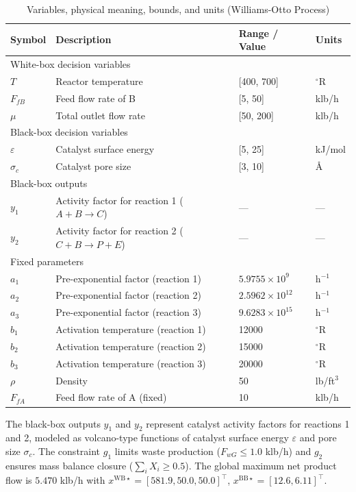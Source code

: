 \documentclass[12pt,a4paper]{article}%
\theoremstyle{plain}%
\theoremstyle{remark}%
\theoremstyle{definition}%
\def\WB{\mathrm{WB}}
\def\BB{\mathrm{BB}}
\begin{document}
\begin{appendices}
\begin{table}[htbp]
\centering
\caption{Variables, physical meaning, bounds, and units (Williams-Otto Process)}
\label{tab:williams_otto_vars}
\begin{tabular}{@{}llll@{}}
\toprule
\textbf{Symbol} & \textbf{Description} & \textbf{Range / Value} & \textbf{Units} \\
\midrule
\multicolumn{4}{l}{White-box decision variables} \\
\midrule
$T$ & Reactor temperature & [400, 700] & $^\circ$R \\
$F_{fB}$ & Feed flow rate of B & [5, 50] & klb/h \\
$\mu$ & Total outlet flow rate & [50, 200] & klb/h \\
\midrule
\multicolumn{4}{l}{Black-box decision variables} \\
\midrule
$\varepsilon$ & Catalyst surface energy & [5, 25] & kJ/mol \\
$\sigma_c$ & Catalyst pore size & [3, 10] & \AA \\
\midrule
\multicolumn{4}{l}{Black-box outputs} \\
\midrule
$y_1$ & Activity factor for reaction 1 ($A + B \to C$) & --- & --- \\
$y_2$ & Activity factor for reaction 2 ($C + B \to P + E$) & --- & --- \\
\midrule
\multicolumn{4}{l}{Fixed parameters} \\
\midrule
$a_1$ & Pre-exponential factor (reaction 1) & $5.9755 \times 10^9$ & h$^{-1}$ \\
$a_2$ & Pre-exponential factor (reaction 2) & $2.5962 \times 10^{12}$ & h$^{-1}$ \\
$a_3$ & Pre-exponential factor (reaction 3) & $9.6283 \times 10^{15}$ & h$^{-1}$ \\
$b_1$ & Activation temperature (reaction 1) & 12000 & $^\circ$R \\
$b_2$ & Activation temperature (reaction 2) & 15000 & $^\circ$R \\
$b_3$ & Activation temperature (reaction 3) & 20000 & $^\circ$R \\
$\rho$ & Density & 50 & lb/ft$^3$ \\
$F_{fA}$ & Feed flow rate of A (fixed) & 10 & klb/h \\
\bottomrule
\end{tabular}
\end{table}

The black-box outputs $y_1$ and $y_2$ represent catalyst activity factors for reactions 1 and 2, modeled as volcano-type functions of catalyst surface energy $\varepsilon$ and pore size $\sigma_c$. The constraint $g_1$ limits waste production ($F_{wG} \leq 1.0$ klb/h) and $g_2$ ensures mass balance closure ($\sum_i X_i \geq 0.5$). The global maximum net product flow is $5.470$ klb/h with $x^{\WB\star} = [581.9, 50.0, 50.0]^\top$, $x^{\BB\star} = [12.6, 6.11]^\top$.


\end{appendices}
\end{document}

